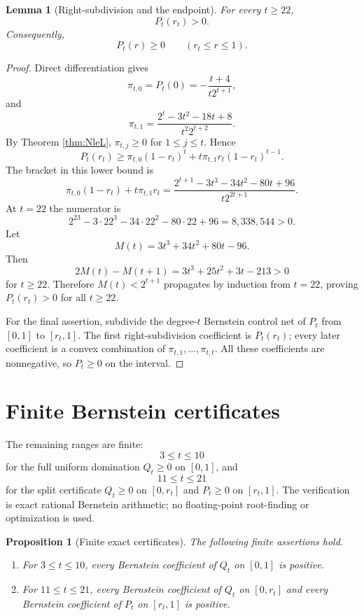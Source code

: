 \documentclass[11pt]{article}
\newtheorem{lemma}[theorem]{Lemma}
\newtheorem{proposition}[theorem]{Proposition}
\theoremstyle{definition}
\begin{document}
\begin{lemma}[Right-subdivision and the endpoint]\label{lem:endpoint}
For every $t\ge22$,
\[
  P_t(r_t)>0.
\]
Consequently,
\[
  P_t(r)\ge0\qquad(r_t\le r\le1).
\]
\end{lemma}

\begin{proof}
Direct differentiation gives
\[
  \pi_{t,0}=P_t(0)=-\frac{t+4}{t2^{t+1}},
\]
and
\[
  \pi_{t,1}=\frac{2^t-3t^2-18t+8}{t^2 2^{t+2}}.
\]
By Theorem \ref{thm:NleL}, $\pi_{t,j}\ge0$ for $1\le j\le t$.  Hence
\[
P_t(r_t)\ge \pi_{t,0}(1-r_t)^t+t\pi_{t,1}r_t(1-r_t)^{t-1}.
\]
The bracket in this lower bound is
\[
\pi_{t,0}(1-r_t)+t\pi_{t,1}r_t
=\frac{2^{t+1}-3t^3-34t^2-80t+96}{t2^{2t+1}}.
\]
At $t=22$ the numerator is
\[
  2^{23}-3\cdot22^3-34\cdot22^2-80\cdot22+96=8{,}338{,}544>0.
\]
Let
\[
  M(t)=3t^3+34t^2+80t-96.
\]
Then
\[
  2M(t)-M(t+1)=3t^3+25t^2+3t-213>0
\]
for $t\ge22$.  Therefore $M(t)<2^{t+1}$ propagates by induction from $t=22$, proving $P_t(r_t)>0$ for all $t\ge22$.

For the final assertion, subdivide the degree-$t$ Bernstein control net of $P_t$ from $[0,1]$ to $[r_t,1]$.  The first right-subdivision coefficient is $P_t(r_t)$; every later coefficient is a convex combination of $\pi_{t,1},\ldots,\pi_{t,t}$.  All these coefficients are nonnegative, so $P_t\ge0$ on the interval.
\end{proof}

\section{Finite Bernstein certificates}

The remaining ranges are finite:
\[
  3\le t\le10
\]
for the full uniform domination $Q_t\ge0$ on $[0,1]$, and
\[
  11\le t\le21
\]
for the split certificate $Q_t\ge0$ on $[0,r_t]$ and $P_t\ge0$ on $[r_t,1]$.
The verification is exact rational Bernstein arithmetic; no floating-point root-finding or optimization is used.

\begin{proposition}[Finite exact certificates]\label{prop:finite}
The following finite assertions hold.
\begin{enumerate}[label=(\roman*)]
\item For $3\le t\le10$, every Bernstein coefficient of $Q_t$ on $[0,1]$ is positive.
\item For $11\le t\le21$, every Bernstein coefficient of $Q_t$ on $[0,r_t]$ and every Bernstein coefficient of $P_t$ on $[r_t,1]$ is positive.
\end{enumerate}
\end{proposition}
\end{document}
